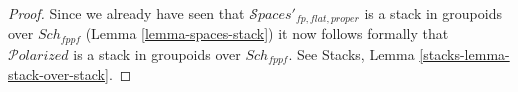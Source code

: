 \documentclass{stacks-project}
\theoremstyle{plain}
\theoremstyle{definition}
\theoremstyle{remark}
\numberwithin{equation}{subsection}
\def\Sch{\mathit{Sch}}
\def\Spacesstack{\mathcal{S}\!\mathit{paces}}
\def\Polarizedstack{\mathcal{P}\!\mathit{olarized}}
\begin{document}
\begin{proof}
\medskip\noindent
Since we already have seen that $\Spacesstack'_{fp, flat, proper}$
is a stack in groupoids over $\Sch_{fppf}$
(Lemma \ref{lemma-spaces-stack}) it now follows formally
that $\Polarizedstack$ is a stack in groupoids over $\Sch_{fppf}$.
See Stacks, Lemma \ref{stacks-lemma-stack-over-stack}.
\end{proof}
\end{document}
